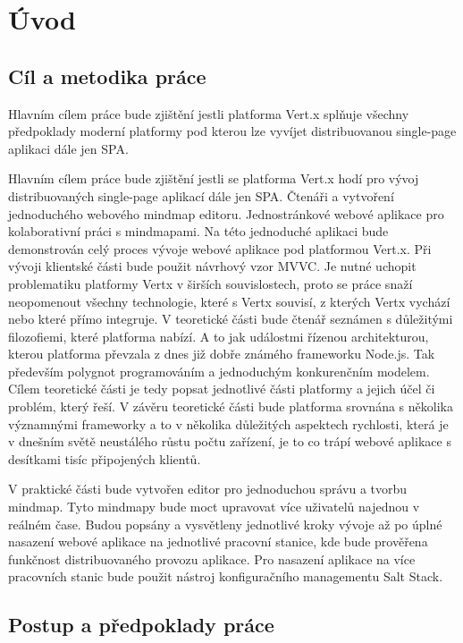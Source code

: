 

\chapter{Úvod}

\section{Cíl a metodika práce}

Hlavním cílem práce bude zjištění jestli platforma Vert.x splňuje všechny předpoklady moderní platformy pod kterou lze vyvíjet distribuovanou single-page aplikaci dále jen SPA. 

Hlavním cílem práce bude zjištění jestli se  platforma Vert.x hodí pro vývoj distribuovaných single-page aplikací dále jen SPA. Čtenáři a vytvoření jednoduchého webového mindmap editoru. Jednostránkové webové aplikace pro kolaborativní práci s mindmapami. Na této jednoduché aplikaci bude demonstrován celý proces vývoje webové aplikace pod platformou Vert.x. Při vývoji klientské části bude použit návrhový vzor MVVC. Je nutné uchopit problematiku platformy Vertx v širších souvislostech, proto se práce snaží neopomenout všechny technologie, které s Vertx souvisí, z kterých Vertx vychází nebo které přímo integruje. V teoretické části bude čtenář seznámen s důležitými filozofiemi, které platforma nabízí. A to jak událostmi řízenou architekturou, kterou platforma převzala z dnes již dobře známého frameworku Node.js. Tak především polygnot programováním a jednoduchým konkurenčním modelem. Cílem teoretické části je tedy popsat jednotlivé části platformy a jejich účel či problém, který řeší. V závěru teoretické části bude platforma srovnána s několika významnými frameworky a to v několika důležitých aspektech rychlosti, která je v dnešním světě neustálého růstu počtu zařízení, je to co trápí webové aplikace s desítkami tisíc připojených klientů.

V praktické části bude vytvořen editor pro jednoduchou správu a tvorbu mindmap. Tyto mindmapy bude moct upravovat více uživatelů najednou v reálném čase. Budou popsány a vysvětleny jednotlivé kroky vývoje až po úplné nasazení webové aplikace na jednotlivé pracovní stanice, kde bude prověřena funkčnost distribuovaného provozu aplikace. Pro nasazení aplikace na více pracovních stanic bude použit nástroj konfiguračního managementu Salt Stack.

\section{Postup a předpoklady práce}


